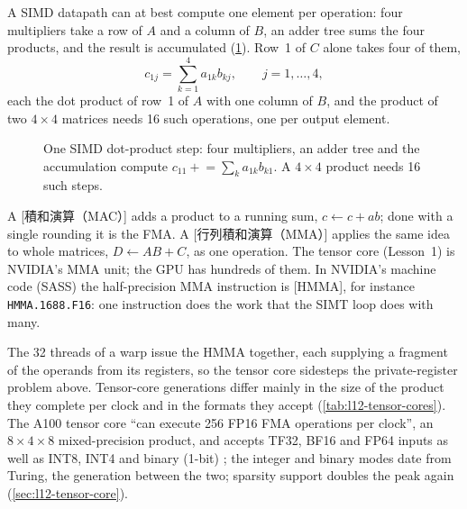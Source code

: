 \documentclass[../main.tex]{subfiles}
\begin{document}
A SIMD datapath can at best compute one element per operation: four
multipliers take a row of $A$ and a column of $B$, an adder tree sums
the four products, and the result is accumulated
(\cref{fig:l12-dot-unit}).  Row~1 of $C$ alone takes four of them,
\[
  c_{1j} = \sum_{k=1}^{4} a_{1k} b_{kj} , \qquad j = 1, \ldots, 4 ,
\]
each the dot product of row~1 of $A$ with one column of $B$, and the
product of two $4 \times 4$ matrices needs 16 such operations, one per
output element.

\begin{figure}[tb]
  \centering
  
  \caption{One SIMD dot-product step: four multipliers, an adder tree and
    the accumulation compute $c_{11} \mathrel{+}= \sum_k a_{1k} b_{k1}$.
    A $4 \times 4$ product needs 16 such steps.}
  \label{fig:l12-dot-unit}
\end{figure}

\begin{definition}
  A [積和演算（MAC）] adds a product to
  a running sum, $c \leftarrow c + a b$; done with a single rounding it is
  the FMA.  A
  [行列積和演算（MMA）] applies
  the same idea to whole matrices, $D \leftarrow A B + C$, as one
  operation.  The tensor core (Lesson~1) is NVIDIA's MMA unit; the GPU
  has hundreds of them.  In NVIDIA's machine code (SASS) the half-precision MMA
  instruction is [HMMA], for instance
  \texttt{HMMA.1688.F16}: one instruction does the work that the SIMT
  loop does with many.
\end{definition}


The 32 threads of a warp issue the HMMA together, each supplying a
fragment of the operands from its registers, so the tensor core
sidesteps the private-register problem above.
Tensor-core generations differ mainly in the size of the product they
complete per clock and in the formats they accept
(\cref{tab:l12-tensor-cores}).  The A100 tensor core \enquote{can execute
256 FP16 FMA operations per clock}, an $8 \times 4 \times 8$
mixed-precision product, and accepts TF32, BF16 and FP64 inputs as
well as INT8, INT4 and binary (1-bit) \cite{nvidia2020ampere}; the
integer and binary modes date from Turing, the generation between the
two; sparsity support doubles the peak
again (\cref{sec:l12-tensor-core}).
\end{document}
